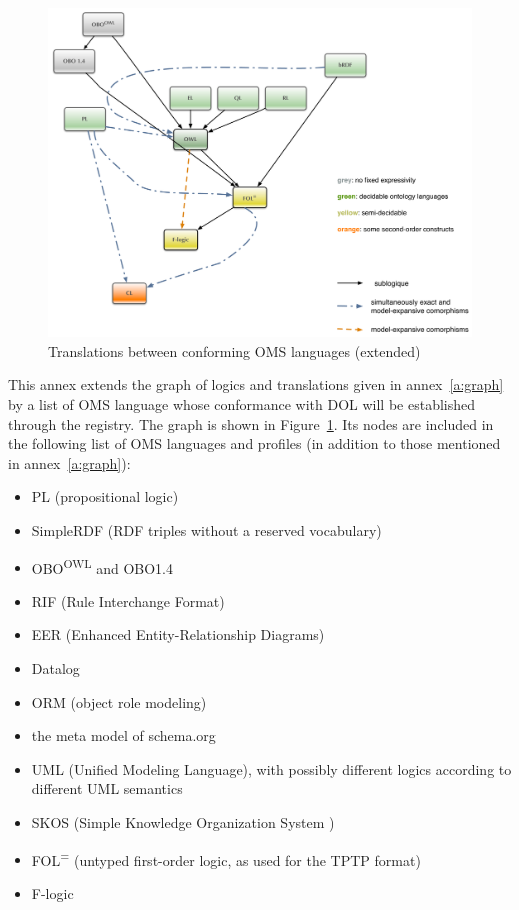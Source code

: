 \documentclass[10pt,fleqn,%
\ifpretendfinal
final%
\else
draft%
\fi,
]{scrreprt}
\newcommand{\annexrefname}{annex}
\newcommand{\figurerefname}{Figure}
\newcommand{\aref}[1]{\annexrefname~\ref{#1}}
\newcommand{\fref}[1]{\figurerefname~\ref{#1}}
\begin{document}
\begin{figure}
  \centering
  \includegraphics[width=\textwidth]{illustrations/pre-reduced-ontograph}
  \caption{Translations between conforming OMS languages (extended)}
  \label{fig:pre-ontograph}
\end{figure}
This annex extends the graph of logics and translations given in
\aref{a:graph} by a list of OMS language whose conformance with
DOL will be established through the registry.  The graph is shown in
\fref{fig:pre-ontograph}.  Its nodes are included in the following
list of OMS languages and profiles (in addition to those
mentioned in \aref{a:graph}):
\begin{itemize}
\item PL (propositional logic)
\item SimpleRDF (RDF triples without a reserved vocabulary)
\item OBO\textsuperscript{OWL} and OBO1.4
\item RIF (Rule Interchange Format)
\item EER (Enhanced Entity-Relationship Diagrams) %
\item Datalog
\item ORM (object role modeling)
\item the meta model of schema.org
\item UML (Unified Modeling Language), with possibly different logics according to different
UML semantics
\item SKOS (Simple Knowledge Organization System )
\item FOL\textsuperscript{=} (untyped first-order logic, as used for the
TPTP format)
\item F-logic
\end{itemize}
\end{document}

